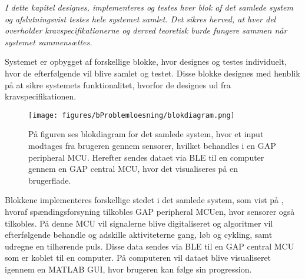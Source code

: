 \textit{I dette kapitel designes, implementeres og testes hver blok af det samlede system og afslutningsvist testes hele systemet samlet. Det sikres herved, at hver del overholder kravspecifikationerne og derved teoretisk burde fungere sammen når systemet sammensættes.}

Systemet er opbygget af forskellige blokke, hvor designes og testes individuelt, hvor de efterfølgende vil blive samlet og testet. Disse blokke designes med henblik på at sikre systemets funktionalitet, hvorfor de designes ud fra kravspecifikationen.

\begin{figure}[H]
	\centering
	\texttt{[image: figures/bProblemloesning/blokdiagram.png]}
	\caption{På figuren ses blokdiagram for det samlede system, hvor et input modtages fra brugeren gennem sensorer, hvilket behandles i en GAP peripheral MCU. Herefter sendes dataet via BLE til en computer gennem en GAP central MCU, hvor det visualiseres på en brugerflade.}
	\label{fig:design_blokdiagram}
\end{figure}

Blokkene implementeres forskellige stedet i det samlede system, som vist på , hvoraf spændingsforsyning tilkobles GAP peripheral MCUen, hvor sensorer også tilkobles. På denne MCU vil signalerne blive digitaliseret og algoritmer vil efterfølgende behandle og adskille aktiviteterne gang, løb og cykling, samt udregne en tilhørende puls. Disse data sendes via BLE til en GAP central MCU som er koblet til en computer. På computeren vil dataet blive visualiseret igennem en MATLAB GUI, hvor brugeren kan følge sin progression.  